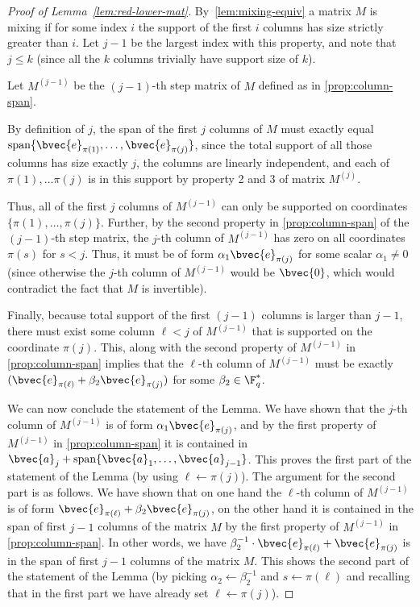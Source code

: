 \documentclass[11pt]{article}
\newcommand{\Mat}[1]{M^{(#1)}}
\begin{document}
\begin{proof}[Proof of Lemma~\ref{lem:red-lower-mat}]
	By~\cref{lem:mixing-equiv} a matrix $M$ is mixing if for some index $i$ the support of the first $i$ columns has size strictly greater than $i$. Let $j-1$ be the largest index with this property, and note that $j \leq k$ (since all the $k$ columns trivially have support size of $k$).
	
	Let $\Mat{j-1}$ be the $(j-1)$-th step matrix of $M$ defined as in \cref{prop:column-span}.
	

	By definition of $j$, the span of the first $j$ columns of $M$ must exactly equal
	$\text{span}\{\bvec{e}_{\pi(1)}, \dots, \bvec{e}_{\pi(j )}\}$, since the total support of all those columns has size exactly $j$, the columns are linearly independent, and each of $\pi(1), \ldots \pi(j)$ is in this support by property 2 and 3 of matrix $M^{(j)}$.

	
	Thus, all of the first $j$ columns of $\Mat{j-1}$ can only be supported on coordinates $\{\pi(1), \dots, \pi(j)\}$.
	Further, by the second property in \cref{prop:column-span} of the $(j-1)$-th step matrix, the $j$-th column of $\Mat{j-1}$ has zero on all coordinates $\pi(s)$ for $s < j$. Thus, it must be of form $\alpha_1 \bvec{e}_{\pi(j)}$ for some scalar $\alpha_1 \not= 0$ (since otherwise the $j$-th column of $\Mat{j-1}$ would be $\bvec{0}$, which would contradict the fact that $M$ is invertible). 

	Finally, because total support of the first $(j-1)$ columns is larger than $j-1$,
	there must exist some column $\ell < j$ of $\Mat{j-1}$
	that is supported on the coordinate $\pi(j)$.
	This, along with the second property of $M^{(j-1)}$ in \cref{prop:column-span} implies that  the $\ell$-th column
	of $\Mat{j-1}$ must be exactly $(\bvec{e}_{\pi(\ell)} + \beta_2 \bvec{e}_{\pi(j)})$ for some $\beta_2 \in \F_q^*$.
	
	We can now conclude the statement of the Lemma.  We have shown that the $j$-th column of $\Mat{j-1}$ is of form $\alpha_1 \bvec{e}_{\pi(j)}$, and by the first property of $\Mat{j-1}$ in \cref{prop:column-span} it is contained in $\bvec{a}_j + \mathrm{span}\{\bvec{a}_1, \ldots, \bvec{a}_{j-1}\}$. This proves the first part of the statement of the Lemma (by using $\ell\gets\pi(j)$). The argument for the second part is as follows.
	We have shown that on one hand the $\ell$-th column of $\Mat{j-1}$ is of form $\bvec{e}_{\pi(\ell)} + \beta_2 \bvec{e}_{\pi(j)}$, on the other hand it is contained in the span of first $j-1$ columns of the matrix $M$ by the first property of $\Mat{j-1}$ in \cref{prop:column-span}. In other words, we have $\beta_2^{-1}\cdot \bvec{e}_{\pi(\ell)}+ \bvec{e}_{\pi(j)}$ is in the span of first $j-1$ columns of the matrix $M$. This shows the second part of the statement of the Lemma (by picking $\alpha_2\gets\beta_2^{-1}$ and $s\gets \pi(\ell)$ and recalling that in the first part we have already set $\ell\gets \pi(j)$). 
	\end{proof}
	
\end{document}
